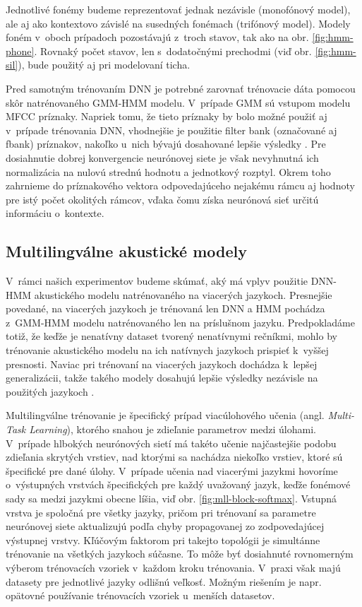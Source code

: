 Jednotlivé fonémy budeme reprezentovať jednak nezávisle (monofónový model), ale aj ako kontextovo závislé na susedných fonémach (trifónový model). Modely foném v~oboch prípadoch pozostávajú z~troch stavov, tak ako na obr. \ref{fig:hmm-phone}. Rovnaký počet stavov, len s~dodatočnými prechodmi (viď obr. \ref{fig:hmm-sil}), bude použitý aj pri modelovaní ticha.

Pred samotným trénovaním DNN je potrebné zarovnať trénovacie dáta pomocou skôr natrénovaného GMM-HMM modelu. V~prípade GMM sú vstupom modelu MFCC príznaky. Napriek tomu, že tieto príznaky by bolo možné použiť aj v~prípade trénovania DNN, vhodnejšie je použitie filter bank (označované aj fbank) príznakov, nakoľko u~nich bývajú dosahované lepšie výsledky \cite{Mohamed2012}. 
Pre dosiahnutie dobrej konvergencie neurónovej siete je však nevyhnutná ich normalizácia na nulovú strednú hodnotu a jednotkový rozptyl. Okrem toho zahrnieme do príznakového vektora odpovedajúceho nejakému rámcu aj hodnoty pre istý počet okolitých rámcov, vďaka čomu získa neurónová sieť určitú informáciu o~kontexte.

\subsection*{Multilingválne akustické modely}

V~rámci našich experimentov budeme skúmať, aký má vplyv použitie DNN-HMM akustického modelu natrénovaného na viacerých jazykoch. Presnejšie povedané, na viacerých jazykoch je trénovaná len DNN a HMM pochádza z~GMM-HMM modelu natrénovaného len na príslušnom jazyku. Predpokladáme totiž, že keďže je nenatívny dataset tvorený nenatívnymi rečníkmi, mohlo by trénovanie akustického modelu na ich natívnych jazykoch prispieť k~vyššej presnosti. Naviac pri trénovaní na viacerých jazykoch dochádza k~lepšej generalizácii, takže takého modely dosahujú lepšie výsledky nezávisle na použitých jazykoch \cite{Huang2013,Ghoshal2013}.

Multilingválne trénovanie je špecifický prípad viacúlohového učenia (angl. \textit{Multi-Task Learning}), ktorého snahou je zdieľanie parametrov medzi úlohami. V~prípade hlbokých neurónových sietí má takéto učenie najčastejšie podobu zdieľania skrytých vrstiev, nad ktorými sa nachádza niekoľko vrstiev, ktoré sú špecifické pre dané úlohy. V~prípade učenia nad viacerými jazykmi hovoríme o~výstupných vrstvách špecifických pre každý uvažovaný jazyk, keďže fonémové sady sa medzi jazykmi obecne líšia, viď obr. \ref{fig:mll-block-softmax}. Vstupná vrstva je spoločná pre všetky jazyky, pričom pri trénovaní sa parametre neurónovej siete aktualizujú podľa chyby propagovanej zo zodpovedajúcej výstupnej vrstvy. Kľúčovým faktorom pri takejto topológii je simultánne trénovanie na všetkých jazykoch súčasne. To môže byť dosiahnuté rovnomerným výberom trénovacích vzoriek v~každom kroku trénovania. V~praxi však majú datasety pre jednotlivé jazyky odlišnú veľkosť. Možným riešením je napr. opätovné používanie trénovacích vzoriek u~menších datasetov.

